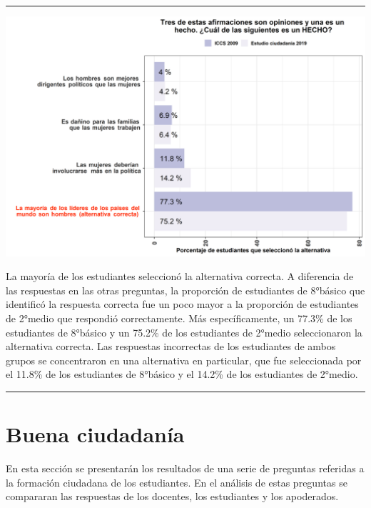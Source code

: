 \documentclass[
  14pt,
]{book}
\let\origfigure\figure
\let\endorigfigure\endfigure
\renewenvironment{figure}[1][2] {
  \expandafter\origfigure\expandafter[H]
} {
  \endorigfigure
}
\begin{document}
\begin{center}\rule{0.5\linewidth}{0.5pt}\end{center}

\begin{figure}[!ht]

{\centering \includegraphics[width=0.8\linewidth,]{images/graph_p6} 

}

\caption{Comparación con ICCS: Afirmación que corresponde a un hecho}\label{fig:unnamed-chunk-24}
\end{figure}

La mayoría de los estudiantes seleccionó la alternativa correcta. A diferencia de las respuestas en las otras preguntas, la proporción de estudiantes de 8°básico que identificó la respuesta correcta fue un poco mayor a la proporción de estudiantes de 2°medio que respondió correctamente. Más específicamente, un 77.3\% de los estudiantes de 8°básico y un 75.2\% de los estudiantes de 2°medio seleccionaron la alternativa correcta. Las respuestas incorrectas de los estudiantes de ambos grupos se concentraron en una alternativa en particular, que fue seleccionada por el 11.8\% de los estudiantes de 8°básico y el 14.2\% de los estudiantes de 2°medio.

\begin{center}\rule{0.5\linewidth}{0.5pt}\end{center}

\hypertarget{buena-ciudadanuxeda}{%
\section{Buena ciudadanía}\label{buena-ciudadanuxeda}}

En esta sección se presentarán los resultados de una serie de preguntas referidas a la formación ciudadana de los estudiantes. En el análisis de estas preguntas se compararan las respuestas de los docentes, los estudiantes y los apoderados.
\end{document}
